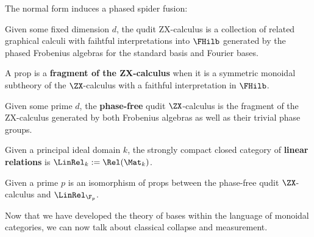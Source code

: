 The normal form induces a phased spider fusion:

\begin{definition}
\label{def:zx}
Given some fixed dimension $d$, the qudit ZX-calculus is a collection of related graphical calculi with faihtful interpretations into $\FHilb$ generated by the phased Frobenius algebras for the standard basis and Fourier bases.

A prop is a {\bf fragment of the ZX-calculus} when it is a symmetric monoidal subtheory of the $\ZX$-calculus with a faithful interpretation in $\FHilb$.
\end{definition}


\begin{definition}
Given some prime $d$, the {\bf phase-free} qudit $\ZX$-calculus
is the fragment of the ZX-calculus generated by both Frobenius algebras as well as their trivial phase groups.
\end{definition}

\begin{definition}
Given a principal ideal domain $k$, the strongly compact closed category of {\bf linear relations} is $\LinRel_k := \Rel(\Mat_k)$.
\end{definition}

\begin{lemma}
Given a prime $p$ is an isomorphism of props between the phase-free qudit $\ZX$-calculus and $\LinRel_{\F_p}$.
\end{lemma}




Now that we have developed the theory of bases within the language of monoidal categories, we can now talk about classical collapse and measurement.


